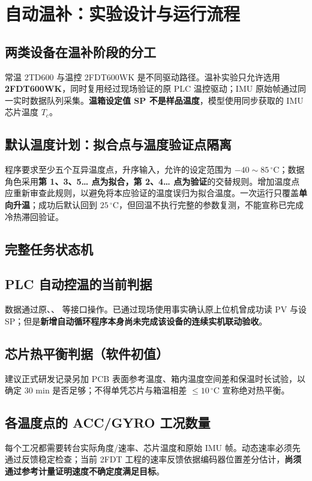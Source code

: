 \chapter{自动温补：实验设计与运行流程}
\section{两类设备在温补阶段的分工}
常温 2TD600 与温控 2FDT600WK 是不同驱动路径。温补实验只允许选用\textbf{2FDT600WK}，同时复用经过现场验证的原 PLC 温控驱动；IMU 原始帧通过同一实时数据队列采集。\textbf{温箱设定值 SP 不是样品温度}，模型使用同步获取的 IMU 芯片温度 $T_c$。

\section{默认温度计划：拟合点与温度验证点隔离}

程序要求至少五个互异温度点，升序输入，允许的设定范围为 $-40\sim85\, ^\circ\mathrm C$；数据角色采用\textbf{第 1、3、5… 点为拟合，第 2、4… 点为验证}的交替规则。增加温度点应重新审查此规则，以避免将本应验证的温度误归为拟合温度。一次运行只覆盖\textbf{单向升温}；成功后默认回到 $25\, ^\circ\mathrm C$，但回温不执行完整的参数复测，不能宣称已完成冷热滞回验证。

\section{完整任务状态机}


\section{PLC 自动控温的当前判据}

数据通过原、、 等接口操作。已通过现场使用事实确认原上位机曾成功读 PV 与设 SP；但是\textbf{新增自动循环程序本身尚未完成该设备的连续实机联动验收}。

\section{芯片热平衡判据（软件初值）}

建议正式研发记录另加 PCB 表面参考温度、箱内温度空间差和保温时长试验，以确定 30 min 是否足够；不得单凭芯片与箱温相差 $\le10\, ^\circ\mathrm C$ 宣称绝对热平衡。

\section{各温度点的 ACC/GYRO 工况数量}

每个工况都需要转台实际角度/速率、芯片温度和原始 IMU 帧。动态速率必须先通过反馈稳定检查；当前 2FDT 工程的速率反馈依据编码器位置差分估计，\textbf{尚须通过参考计量证明速度不确定度满足目标}。
